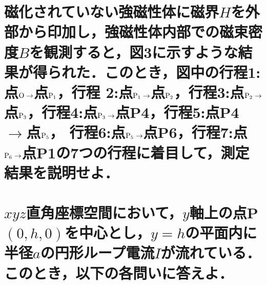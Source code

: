 \documentclass[dvipdfmx]{ujarticle}
\begin{document}
\section{磁化されていない強磁性体に磁界$H$を外部から印加し，強磁性体内部での磁束密度$B$を観測すると，図3に示すような結果が得られた．このとき，図中の行程1:点$\rm{O}\to$点$\rm{P_{1}}$，行程 2:点$\rm{P_{1}}\to$点$\rm{P_{2}}$，行程3:点$\rm{P_{2}}\to$点$\rm{P_{3}}$，行程4:点$\rm{P_{3}}\to$点P4，行程5:点P4 $\to$点$\rm{P_{5}}$， 行程6:点$\rm{P_{5}}\to$点P6，行程7:点$\rm{P_{6}}\to$点P1の7つの行程に着目して，測定結果を説明せよ．}

\section{$xyz$直角座標空間において，$y$軸上の点P$(0, h, 0)$を中心とし，$y=h$の平面内に半径$a$の円形ループ電流$I$が流れている．このとき，以下の各問いに答えよ．}
\end{document}
